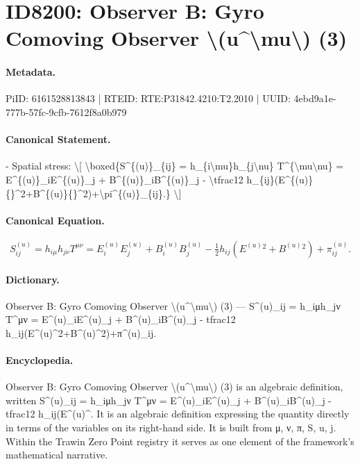 \section*{ID8200: Observer B: Gyro Comoving Observer \textbackslash{}(u\textasciicircum{}\textbackslash{}mu\textbackslash{}) (3)}
\paragraph{Metadata.}
PiID: 6161528813843 | RTEID: RTE:P31842.4210:T2.2010 | UUID: 4ebd9a1e-777b-57fc-9cfb-7612f8a0b979

\paragraph{Canonical Statement.}
- Spatial stress: \textbackslash{}[ \textbackslash{}boxed\{S\textasciicircum{}\{(u)\}\_\{ij\} = h\_\{i\textbackslash{}mu\}h\_\{j\textbackslash{}nu\} T\textasciicircum{}\{\textbackslash{}mu\textbackslash{}nu\} = E\textasciicircum{}\{(u)\}\_iE\textasciicircum{}\{(u)\}\_j + B\textasciicircum{}\{(u)\}\_iB\textasciicircum{}\{(u)\}\_j - \textbackslash{}tfrac12 h\_\{ij\}(E\textasciicircum{}\{(u)\}\{\}\textasciicircum{}2+B\textasciicircum{}\{(u)\}\{\}\textasciicircum{}2)+\textbackslash{}pi\textasciicircum{}\{(u)\}\_\{ij\}.\} \textbackslash{}]

\paragraph{Canonical Equation.}
\[
\boxed{S^{(u)}_{ij} = h_{i\mu}h_{j\nu} T^{\mu\nu} = E^{(u)}_iE^{(u)}_j + B^{(u)}_iB^{(u)}_j - \tfrac12 h_{ij}(E^{(u)}{}^2+B^{(u)}{}^2)+\pi^{(u)}_{ij}.}
\]

\paragraph{Dictionary.}
Observer B: Gyro Comoving Observer \textbackslash{}(u\textasciicircum{}\textbackslash{}mu\textbackslash{}) (3) — S\textasciicircum{}(u)\_ij = h\_iμh\_jν T\textasciicircum{}μν = E\textasciicircum{}(u)\_iE\textasciicircum{}(u)\_j + B\textasciicircum{}(u)\_iB\textasciicircum{}(u)\_j - tfrac12 h\_ij(E\textasciicircum{}(u)\textasciicircum{}2+B\textasciicircum{}(u)\textasciicircum{}2)+π\textasciicircum{}(u)\_ij.

\paragraph{Encyclopedia.}
Observer B: Gyro Comoving Observer \textbackslash{}(u\textasciicircum{}\textbackslash{}mu\textbackslash{}) (3) is an algebraic definition, written S\textasciicircum{}(u)\_ij = h\_iμh\_jν T\textasciicircum{}μν = E\textasciicircum{}(u)\_iE\textasciicircum{}(u)\_j + B\textasciicircum{}(u)\_iB\textasciicircum{}(u)\_j - tfrac12 h\_ij(E\textasciicircum{}(u)\textasciicircum{}. It is an algebraic definition expressing the quantity directly in terms of the variables on its right-hand side. It is built from μ, ν, π, S, u, j. Within the Trawin Zero Point registry it serves as one element of the framework's mathematical narrative.
